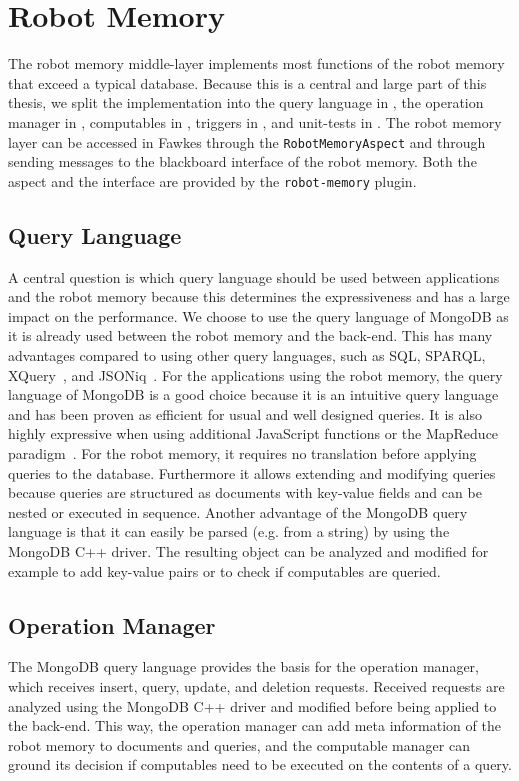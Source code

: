 \section{Robot Memory}
\label{sec:impl-memory}
The robot memory middle-layer implements most functions of the robot
memory that exceed a typical database. Because this is a central and
large part of this thesis, we split the implementation into the query
language in , the operation manager in
, computables in
, triggers in ,
and unit-tests in . The robot memory layer
can be accessed in Fawkes through the \texttt{RobotMemoryAspect} and
through sending messages to the blackboard interface of the robot
memory. Both the aspect and the interface are provided by the
\texttt{robot-memory} plugin.

\subsection{Query Language}
\label{sec:impl-query-language}
A central question is which query language should be used between
applications and the robot memory because this determines the
expressiveness and has a large impact on the performance. We choose to
use the query language of MongoDB as it is already used between the
robot memory and the back-end. This has many advantages compared to
using other query languages, such as SQL, SPARQL,
XQuery~\cite{query-languages}, and JSONiq~\cite{jsoniq}.  For the
applications using the robot memory, the query language of MongoDB is
a good choice because it is an intuitive query language and has been
proven as efficient for usual and well designed queries. It is also
highly expressive when using additional JavaScript functions or the
MapReduce paradigm~\cite{mongodb,RoboDB}. For the robot memory, it
requires no translation before applying queries to the
database. Furthermore it allows extending and modifying queries
because queries are structured as documents with key-value fields and
can be nested or executed in sequence. Another advantage of the
MongoDB query language is that it can easily be parsed (e.g. from a
string) by using the MongoDB C++ driver. The resulting object can be
analyzed and modified for example to add key-value pairs or to check
if computables are queried.

\subsection{Operation Manager}
\label{sec:impl-opmanager}
The MongoDB query language provides the basis for the operation
manager, which receives insert, query, update, and deletion
requests. Received requests are analyzed using the MongoDB C++ driver
and modified before being applied to the back-end. This way, the
operation manager can add meta information of the robot memory to
documents and queries, and the computable manager can ground its
decision if computables need to be executed on the contents of a
query.

